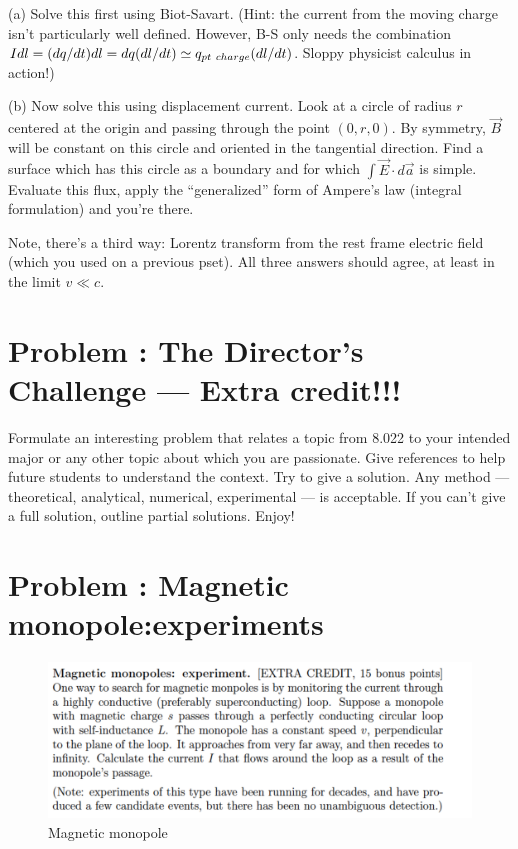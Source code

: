 \documentclass[problems]{esg8022pset}
\begin{document}
\par\noindent (a)  Solve this first using Biot-Savart.  (Hint:
the current from the moving charge isn't particularly well defined.
However, B-S only needs the combination $I dl = (dq/dt) dl = dq
(dl/dt) \simeq q_{\rm pt\ charge}(dl/dt)$.  Sloppy physicist calculus
in action!)

\par\noindent (b)  Now solve this using displacement current.
Look at a circle of radius $r$ centered at the origin and passing
through the point $(0,r,0)$.  By symmetry, $\vec B$ will be constant
on this circle and oriented in the tangential direction.  Find a
surface which has this circle as a boundary and for which $\int \vec
E\cdot d\vec a$ is simple.  Evaluate this flux, apply the
``generalized'' form of Ampere's law (integral formulation) and you're
there.

\par\noindent Note, there's a third way: Lorentz transform from the
rest frame electric field (which you used on a previous pset).  All
three answers should agree, at least in the limit $v \ll c$.

\section{Problem \thesection: The Director's Challenge --- Extra credit!!!}
  Formulate an interesting problem that relates a topic from 8.022 to your
  intended major or any other topic about which you are passionate.  Give references
  to help future students to understand the context.  Try to give a solution.
  Any method --- theoretical, analytical, numerical, experimental --- is acceptable.
  If you can't give a full solution, outline partial solutions. Enjoy!
\section{Problem \thesection: Magnetic monopole:experiments}

 \begin{figure}[H]
    \centering
    \includegraphics[width = 15cm]{monopoles}
    \caption{Magnetic monopole}
  \end{figure}
\end{document}
